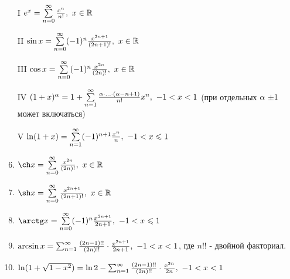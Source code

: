 \begin{enumerate}
	\item[I] \(e^x = \sum\limits_{n = 0}^\infty \frac{x^n}{n!},\ x \in \mathbb{R}\)
	
	\item[II] \(\sin x = \sum\limits_{n = 0}^\infty (-1)^n \frac{x^{2n + 1}}{(2n + 1)!},\ x \in \mathbb{R}\)
	
	\item[III] \(\cos x = \sum\limits_{n = 0}^\infty (-1)^n \frac{x^{2n}}{(2n)!},\ x \in \mathbb{R}\)
	
	\item[IV] \((1 + x)^\alpha = 1 + \sum\limits_{n = 1}^\infty \frac{\alpha \cdot \ldots \cdot (\alpha - n + 1)}{n!}x^n,\ -1 < x < 1\) (при отдельных $\alpha$ $\pm 1$ может включаться)
	
	\item[V] \(\ln(1 + x) = \sum\limits_{n = 1}^\infty (-1)^{n + 1} \frac{x^n}{n},\ -1 < x \leqslant 1\)
	
	\item \(\ch x = \suml_{n = 0}^\infty \frac{x^{2n}}{(2n)!},\ x \in \R\)
	
	\item \(\sh x = \suml_{n = 0}^\infty \frac{x^{2n + 1}}{(2n + 1)!},\ x \in \R\)
	
	\item \(\arctg x = \suml_{n = 0}^\infty (-1)^n \frac{x^{2n + 1}}{2n + 1},\ -1 < x \le 1\)
	
	\item \(\arcsin x = \sum_{n = 1}^\infty \frac{(2n - 1)!!}{(2n)!!} \cdot \frac{x^{2n + 1}}{2n + 1},\ -1 < x < 1\), где $n!!$ - двойной факториал.
	
	\item \(\ln(1 + \sqrt{1 - x^2}) = \ln 2 - \sum_{n = 1}^\infty \frac{(2n - 1)!!}{(2n)!!} \cdot \frac{x^{2n}}{2n},\ -1 < x < 1\)
\end{enumerate}


